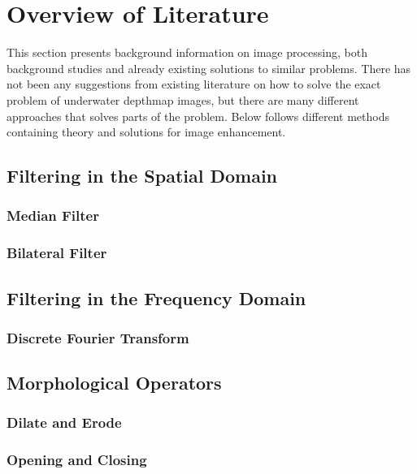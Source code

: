 \section{Overview of Literature}\label{overview}
This section presents background information on image processing, both background studies and already existing solutions to similar problems. There has not been any suggestions from existing literature on how to solve the exact problem of underwater depthmap images, but there are many different approaches that solves parts of the problem.
Below follows different methods containing theory and solutions for image enhancement.


\subsection{Filtering in the Spatial Domain}

\subsubsection{Median Filter}

\subsubsection{Bilateral Filter}


\subsection{Filtering in the Frequency Domain}

\subsubsection{Discrete Fourier Transform}


\subsection{Morphological Operators}

\subsubsection{Dilate and Erode}

\subsubsection{Opening and Closing}


